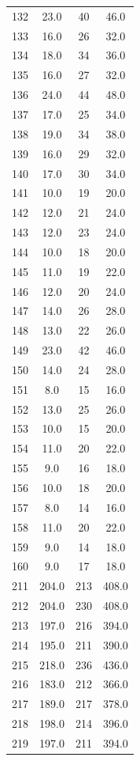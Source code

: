 \documentclass[12pt, a4paper]{report}
\begin{document}
\begin{longtable}{| c | c | c | c |}
  132 & 23.0 & 40 & 46.0 \\
  133 & 16.0 & 26 & 32.0 \\
  134 & 18.0 & 34 & 36.0 \\
  135 & 16.0 & 27 & 32.0 \\
  136 & 24.0 & 44 & 48.0 \\
  137 & 17.0 & 25 & 34.0 \\
  138 & 19.0 & 34 & 38.0 \\
  139 & 16.0 & 29 & 32.0 \\
  140 & 17.0 & 30 & 34.0 \\
  141 & 10.0 & 19 & 20.0 \\
  142 & 12.0 & 21 & 24.0 \\
  143 & 12.0 & 23 & 24.0 \\
  144 & 10.0 & 18 & 20.0 \\
  145 & 11.0 & 19 & 22.0 \\
  146 & 12.0 & 20 & 24.0 \\
  147 & 14.0 & 26 & 28.0 \\
  148 & 13.0 & 22 & 26.0 \\
  149 & 23.0 & 42 & 46.0 \\
  150 & 14.0 & 24 & 28.0 \\
  151 & 8.0 & 15 & 16.0 \\
  152 & 13.0 & 25 & 26.0 \\
  153 & 10.0 & 15 & 20.0 \\
  154 & 11.0 & 20 & 22.0 \\
  155 & 9.0 & 16 & 18.0 \\
  156 & 10.0 & 18 & 20.0 \\
  157 & 8.0 & 14 & 16.0 \\
  158 & 11.0 & 20 & 22.0 \\
  159 & 9.0 & 14 & 18.0 \\
  160 & 9.0 & 17 & 18.0 \\
  211 & 204.0 & 213 & 408.0 \\
  212 & 204.0 & 230 & 408.0 \\
  213 & 197.0 & 216 & 394.0 \\
  214 & 195.0 & 211 & 390.0 \\
  215 & 218.0 & 236 & 436.0 \\
  216 & 183.0 & 212 & 366.0 \\
  217 & 189.0 & 217 & 378.0 \\
  218 & 198.0 & 214 & 396.0 \\
  219 & 197.0 & 211 & 394.0 \\

\end{longtable}
\end{document}
